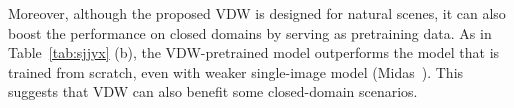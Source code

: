 \documentclass[10pt,twocolumn,letterpaper]{article}
\def\data{VDW}
\def\reftab{Table}
\begin{document}
Moreover, although the proposed \data{} is designed for natural scenes, it can also boost the performance on closed domains by serving as pretraining data. As in \reftab{}~\ref{tab:sjjyx} (b), the \data{}-pretrained model outperforms the model that is trained from scratch, even with weaker single-image model (Midas~\cite{midas}). This suggests that \data{} can also benefit some closed-domain scenarios. 



















\begin{table}
    \centering
    \vspace{-6pt}
    \caption{\textbf{Ablation of bidirectional inference on \data{}.} Bidirectional inference with larger temporal receptive fields can further improve the consistency.} 
    \label{tab:sxsx}
\end{table}
\end{document}
